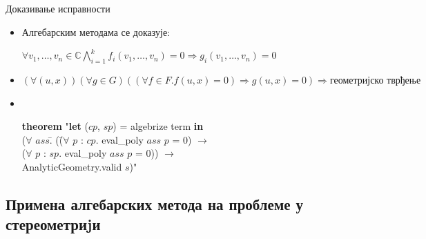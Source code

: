 \documentclass[slidestop, compress, mathserif, containsverbatim, xcolor=dvipsnames]{beamer}
\begin{document}
\begin{frame}{Доказивање исправности}
  \begin{itemize}
  \item Алгебарским методама се доказује: \begin{footnotesize}
    $ \forall v_1, \ldots, v_n \in \mathbb{C} \bigwedge_{i=1}^k
    f_i(v_1, \ldots, v_n) = 0 \Longrightarrow g_i(v_1, \ldots, v_n) =
    0 $ \end{footnotesize} \vfill
  \item \begin{footnotesize} $ (\forall (u, x))(\forall g\in G)( (\forall f\in F. f(u,x) =
    0) \Rightarrow g(u,x) = 0) \Rightarrow \textrm{геометријско
      тврђење} $ \end{footnotesize} \vfill
  \item \begin{footnotesize} {\tt
    \begin{tabbing}
      {\bf theorem} "{\bf let} ($cp$, $sp$) = algebrize term {\bf in} \\
      ({\bf $\forall$} $ass$\=. (\= ({\bf $\forall$} $p$ : $cp$. eval\_poly $ass$ $p$ = 0) $\longrightarrow$ \\
       \>                 \> ({\bf $\forall$} $p$ : $sp$. eval\_poly $ass$ $p$ = 0)) $\longrightarrow$ \\
       \> AnalyticGeometry.valid $s$)"
       \end{tabbing}
      } \end{footnotesize} \vfill
  \end{itemize}
\end{frame}

\subsection*{Примена алгебарских метода на проблеме у стереометриjи}
\end{document}
